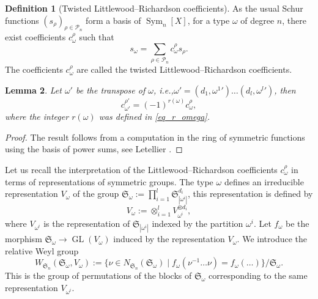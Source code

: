 \documentclass[11pt]{article}
\newcommand{\ie}{i.e.,\xspace}
\theoremstyle{definition}
\newtheorem{definition}{Definition}[section]
\theoremstyle{plain}
\newtheorem{lemma}[definition]{Lemma}
\DeclareMathOperator{\SymF}{Sym}
\DeclareMathOperator{\GL}{GL}
\newcommand{\Sym}{\mathfrak{S}}
\newcommand{\Part}{\mathcal{P}}
\newcommand{\inv}{^{-1}}
\begin{document}
\begin{definition}[Twisted Littlewood--Richardson coefficients]\label{def_twisted_c}
As the usual Schur functions $(s_{\rho})_{\rho\in \Part_n}$ form a basis of $\SymF_n [X]$, for a type $\omega$ of degree $n$, there exist coefficients $c_{\omega}^{\rho}$ such that
\[
s_{\omega} = \sum_{\rho\in\Part_n} c^{\rho}_{\omega} s_{\rho}.
\]
The coefficients $c_{\omega}^{\rho}$ are called the twisted Littlewood--Richardson coefficients.
\end{definition}
\begin{lemma}\label{lemma_transpose_r_omega}
Let $\omega'$ be the transpose of $\omega$, \ie $\omega'=(d_1,{\omega^1}')\dots(d_l,{\omega^l}')$, then
\[
c^{\rho'}_{\omega'}=(-1)^{r(\omega)} c^{\rho}_{\omega},
\]
where the integer $r(\omega)$ was defined in \eqref{eq_r_omega}.
\end{lemma}
\begin{proof}
The result follows from a computation in the ring of symmetric functions using the basis of power sums, see Letellier \cite[6.2.4]{Letellier_gl}.
\end{proof}

Let us recall the interpretation of the Littlewood--Richardson coefficients $c_{\omega}^{\rho}$ in terms of representations of symmetric groups. The type $\omega$ defines an irreducible representation $V_{\omega}$ of the group $\Sym_{\omega}:=\prod_{i=1}^l \Sym_{|\omega^i|}^{d_i}$, this representation is defined by
\[
V_{\omega}:=\otimes_{i=1}^l V_{\omega^i}^{\otimes d_i},
\]
where $V_{\omega^i}$ is the representation of $\Sym_{|\omega^i|}$ indexed by the partition $\omega^i$. Let $f_{\omega}$ be the morphism $\Sym_{\omega}\to \GL(V_{\omega})$ induced by the representation $V_{\omega}$. We introduce the relative Weyl group
\[
W_{\Sym_n}(\Sym_{\omega},V_{\omega}) :=\lbrace \nu \in N_{\Sym_n}(\Sym_{\omega}) \mid f_{\omega}(\nu\inv \dots \nu) = f_{\omega}(\dots)\rbrace/ \Sym_{\omega}.
\]
This is the group of permutations of the blocks of $\Sym_{\omega}$ corresponding to the same representation $V_{\omega^i}$.
\end{document}
